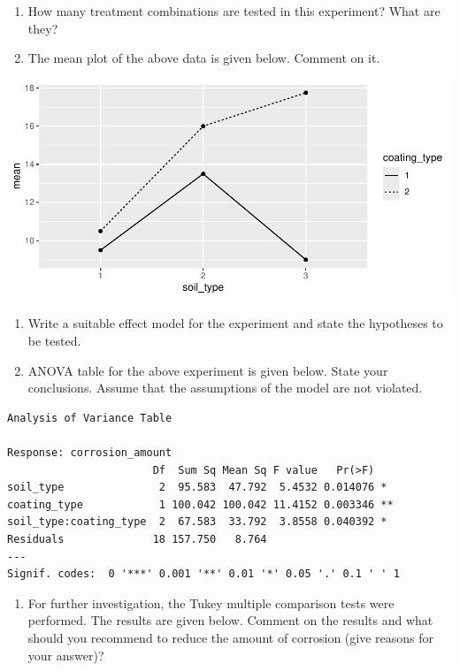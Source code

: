 \documentclass[
  a4paper]{article}
\providecommand{\tightlist}{%
  \setlength{\itemsep}{0pt}\setlength{\parskip}{0pt}}
\begin{document}
\begin{enumerate}
\def\labelenumi{\roman{enumi})}
\item
  How many treatment combinations are tested in this experiment? What
  are they?
\item
  The mean plot of the above data is given below. Comment on it.
\end{enumerate}

\includegraphics{index_files/figure-latex/unnamed-chunk-6-1.pdf}

\begin{enumerate}
\def\labelenumi{\roman{enumi})}
\setcounter{enumi}{2}
\item
  Write a suitable effect model for the experiment and state the
  hypotheses to be tested.
\item
  ANOVA table for the above experiment is given below. State your
  conclusions. Assume that the assumptions of the model are not
  violated.
\end{enumerate}

\begin{verbatim}
Analysis of Variance Table

Response: corrosion_amount
                       Df  Sum Sq Mean Sq F value   Pr(>F)   
soil_type               2  95.583  47.792  5.4532 0.014076 * 
coating_type            1 100.042 100.042 11.4152 0.003346 **
soil_type:coating_type  2  67.583  33.792  3.8558 0.040392 * 
Residuals              18 157.750   8.764                    
---
Signif. codes:  0 '***' 0.001 '**' 0.01 '*' 0.05 '.' 0.1 ' ' 1
\end{verbatim}

\begin{enumerate}
\def\labelenumi{\alph{enumi})}
\setcounter{enumi}{21}
\tightlist
\item
  For further investigation, the Tukey multiple comparison tests were
  performed. The results are given below. Comment on the results and
  what should you recommend to reduce the amount of corrosion (give
  reasons for your answer)?
\end{enumerate}
\end{document}
